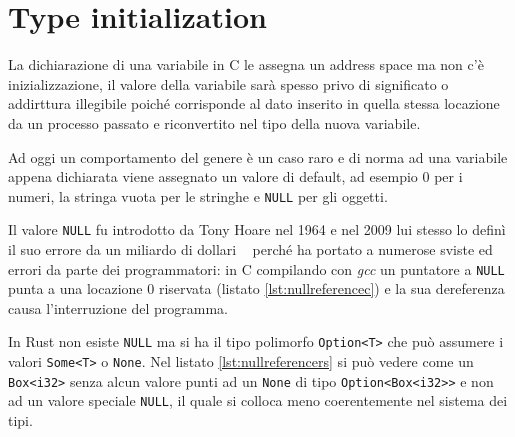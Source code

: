 \documentclass[Lau,binding=0.6cm]{sapthesis}
\newcommand{\textcode}[1]{\colorbox{backcolour}{\texttt{#1}}}
\begin{document}
 

\section{Type initialization} \label{sec:type_initialization}
La dichiarazione di una variabile in C le assegna un address space ma non c'è inizializzazione, il valore della variabile sarà spesso privo di significato o addirttura illegibile poiché corrisponde al dato inserito in quella stessa locazione da un processo passato e riconvertito nel tipo della nuova variabile.

Ad oggi un comportamento del genere è un caso raro e di norma ad una variabile appena dichiarata viene assegnato un valore di default, ad esempio $ 0 $ per i numeri, la stringa vuota per le stringhe e \textcode{NULL} per gli oggetti.

Il valore \textcode{NULL} fu introdotto da Tony Hoare nel 1964 e nel 2009 lui stesso lo definì il suo errore da un miliardo di dollari ~\cite{hoare:billion_dollar_mistake} perché ha portato a numerose sviste ed errori da parte dei programmatori: in C compilando con \textit{gcc} un puntatore a \textcode{NULL} punta a una locazione $ 0 $ riservata (listato \ref{lst:nullreferencec}) e la sua dereferenza causa l'interruzione del programma. 




In Rust non esiste \textcode{NULL} ma si ha il tipo polimorfo \textcode{Option<T>} che può assumere i valori \textcode{Some<T>} o \textcode{None}. 
Nel listato \ref{lst:nullreferencers} si può vedere come un \texttt{Box<i32>} senza alcun valore punti ad un \textcode{None} di tipo \textcode{Option<Box<i32>{}>} e non ad un valore speciale \textcode{NULL}, il quale si colloca meno coerentemente nel sistema dei tipi.



\end{document}
